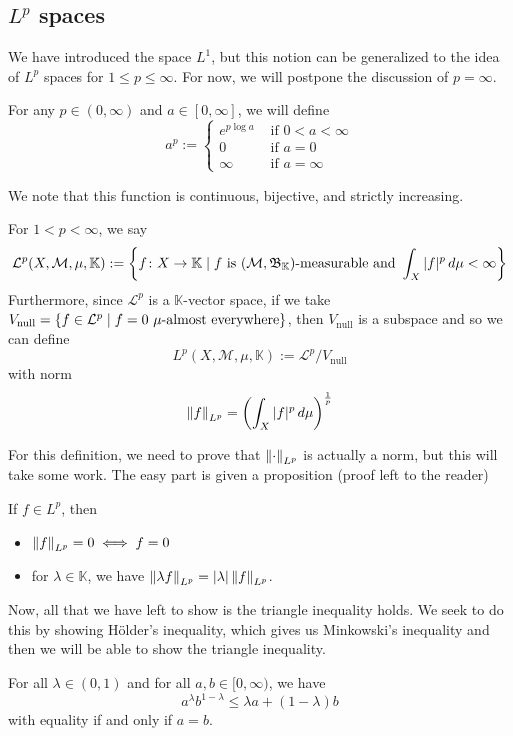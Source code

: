 \documentclass[11pt,leqno,oneside]{amsbook}
\numberwithin{thm}{section}
\newcommand{\M}{\mathcal{M}}
\newcommand{\cL}{\mathcal{L}}
\newcommand{\K}{\mathbb{K}} %
\begin{document}
\subsection{\(L^p\) spaces}
We have introduced the space \(L^1\), but this notion can be
generalized to the idea of \(L^p\) spaces for \(1 \leq p \leq
\infty\). For now, we will postpone the discussion of \(p = \infty\).
\begin{defn}
  For any \(p \in (0,\infty)\) and \(a \in [0,\infty]\), we will
  define \[
    a^p :=
    \begin{cases}
      e^{p \log a} & \text{ if } 0 < a < \infty \\
      0 & \text{ if } a = 0 \\
      \infty & \text{ if } a = \infty
    \end{cases}
  \]
\end{defn}
We note that this function is continuous, bijective, and strictly
increasing.
\begin{defn}
  For \(1 < p < \infty\), we say \[
    \cL^p(X,\M,\mu,\K) := \left\{ f \from X \to \K \st f \text{ is
      }(\M,\B_\K)\text{-measurable and }\int_X |f|^p \d\mu < \infty \right\}
  \]
  Furthermore, since \(\cL^p\) is a \(\K\)-vector space, if we take
  \(V_\text{null} = \{f \in \cL^p \st f=0\
  \mu\text{-almost everywhere}\}\), then \(V_\text{null}\) is a
  subspace and so we can define \[
    L^p(X,\M,\mu,\K) := \cL^p/V_\text{null}
  \]
  with norm \[
    \norm[f]_{L^p} = \left( \int_X |f|^p \d\mu \right)^{\frac{1}{p}}
  \]
\end{defn}
For this definition, we need to prove that \(\norm_{L^p}\) is actually
a norm, but this will take some work. The easy part is given a
proposition (proof left to the reader)
\begin{prop}
  If \(f \in L^p\), then
  \begin{itemize}
  \item \(\norm[f]_{L^p} = 0 \iff f = 0\)
  \item for \(\lambda \in \K\), we have \(\norm[\lambda f]_{L^p} = |\lambda|\norm[f]_{L^p}\).
  \end{itemize}
\end{prop}
Now, all that we have left to show is the triangle inequality
holds. We seek to do this by showing H\"{o}lder's inequality, which
gives us Minkowski's inequality and then we will be able to show the
triangle inequality.
\begin{lem}
  For all \(\lambda \in (0,1)\) and for all \(a,b \in [0,\infty)\), we
  have \[
    a^\lambda b^{1-\lambda} \leq \lambda a + (1-\lambda)b
  \]
  with equality if and only if \(a=b\).
\end{lem}
\end{document}
